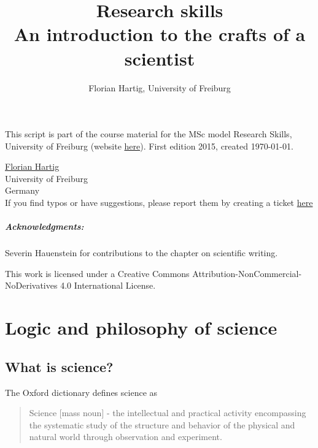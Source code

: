 \documentclass{tufte-book}
\title{Research skills\\
\large{An introduction to the crafts of a scientist}}
\author{Florian Hartig, University of Freiburg}
\begin{document}
\let\cleardoublepage\clearpage
\maketitle


\thispagestyle{empty}
\null

\begin{fullwidth}
This script is part of the course material for the MSc model Research Skills, University of Freiburg (website \href{http://florianhartig.github.io/ResearchSkills/}{here}). First edition 2015, created \today.\\[0.5cm]
\end{fullwidth}

\href{https://florianhartig.wordpress.com/}{Florian Hartig}\\
University of Freiburg\\
Germany\\[0.2cm]
If you find typos or have suggestions, please report them by creating a ticket \href{https://github.com/florianhartig/ResearchSkills/issues}{here}




\paragraph{Acknowledgments:}Severin Hauenstein for contributions to the chapter on scientific writing.


\vfill
\begin{fullwidth}
This work is licensed under a Creative Commons Attribution-NonCommercial-NoDerivatives 4.0 International License.
\end{fullwidth}


\newpage
\tableofcontents

\newpage




\chapter{Logic and philosophy of science}

\section{What is science?}

The Oxford dictionary defines science as 

\begin{quote}
Science [mass noun] - the intellectual and practical activity encompassing the systematic study of the structure and behavior of the physical and natural world through observation and experiment.
\end{quote}
\end{document}
